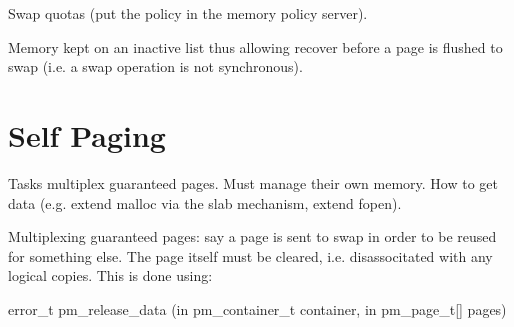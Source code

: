 Swap quotas (put the policy in the memory policy server).

Memory kept on an inactive list thus allowing recover before a page is
flushed to swap (i.e. a swap operation is not synchronous).

\section{Self Paging}

Tasks multiplex guaranteed pages.  Must manage their own memory.  How
to get data (e.g. extend malloc via the slab mechanism, extend fopen).

Multiplexing guaranteed pages: say a page is sent to swap in order to
be reused for something else.  The page itself must be cleared,
i.e. disassocitated with any logical copies.  This is done using:

\begin{code}
error\_t pm\_release\_data (in pm\_container\_t container, in pm\_page\_t[] pages)
\end{code}


% 
% 
% 
% 
